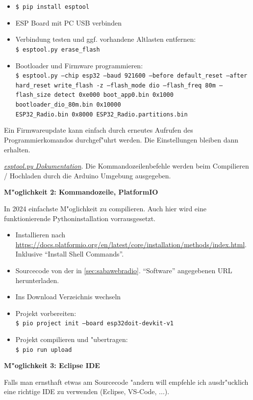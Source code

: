 \documentclass[ngerman,11pt,parskip=half] {scrartcl}
\begin{document}
\begin{itemize}
\item \texttt{\$ pip install esptool}
\item ESP Board mit PC USB verbinden
\item Verbindung testen und ggf. vorhandene Altlasten entfernen:\\
		\texttt{\$ esptool.py erase\_flash}
\item Bootloader und Firmware programmieren:\\
		\texttt{\$ esptool.py --chip esp32  --baud 921600 --before default\_reset --after hard\_reset write\_flash -z --flash\_mode dio --flash\_freq 80m --flash\_size detect 0xe000 boot\_app0.bin 0x1000 bootloader\_dio\_80m.bin 0x10000 \\ESP32\_Radio.bin 0x8000 ESP32\_Radio.partitions.bin}
\end{itemize}

Ein Firmwareupdate kann einfach durch erneutes Aufrufen des Programmierkomandos durchgef"uhrt werden. Die Einstellungen bleiben dann erhalten.

\emph{\href{https://docs.espressif.com/projects/esptool/en/latest/esp32s3/esptool/index.html}{esptool.py Dokumentation}}. Die Kommandozeilenbefehle werden beim Compilieren / Hochladen durch die Arduino Umgebung ausgegeben.

\textbf{M"oglichkeit 2: Kommandozeile, PlatformIO}

In 2024 einfachste M"oglichkeit zu compilieren. Auch hier wird eine funktionierende Pythoninstallation vorrausgesetzt.

\begin{itemize}
\item Installieren nach \url{https://docs.platformio.org/en/latest/core/installation/methods/index.html}. Inklusive "`Install Shell Commands"'.
\item Sourcecode von der in \ref{sec:sabawebradio}. "`Software"' angegebenen URL herunterladen.
\item Ins Download Verzeichnis wechseln
\item Projekt vorbereiten:\\
		\texttt{\$ pio project init --board esp32doit-devkit-v1}
\item Projekt compilieren und "ubertragen:\\
		\texttt{\$ pio run upload}
\end{itemize}

\textbf{M"oglichkeit 3: Eclipse IDE}

Falls man ernsthaft etwas am Sourcecode "andern will empfehle ich ausdr"ucklich eine richtige IDE zu verwenden (Eclipse, VS-Code, ...).
\end{document}
